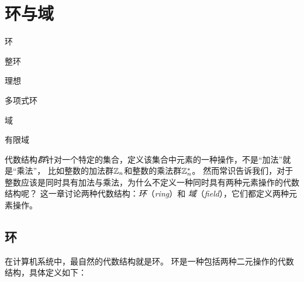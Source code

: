 
\chapter{环与域}
\label{chap:ring_field} 
\begin{introduction}
  \item 环
  \item 整环
  \item 理想
  \item 多项式环
  \item 域
  \item 有限域
\end{introduction}
代数结构\emph{群}针对一个特定的集合，定义该集合中元素的一种操作，不是“加法”就是“乘法”，
比如整数的加法群${\mathbb Z}_n$和整数的乘法群${\mathbb Z}_n^*$。
然而常识告诉我们，对于整数应该是同时具有加法与乘法，为什么不定义一种同时具有两种元素操作的代数结构呢？
这一章讨论两种代数结构：\emph{环}（\emph{ring}）和
\emph{域}（\emph{field}），它们都定义两种元素操作。

\section{环}
\label{sec:ring}
在计算机系统中，最自然的代数结构就是环。
环是一种包括两种二元操作的代数结构，具体定义如下：

